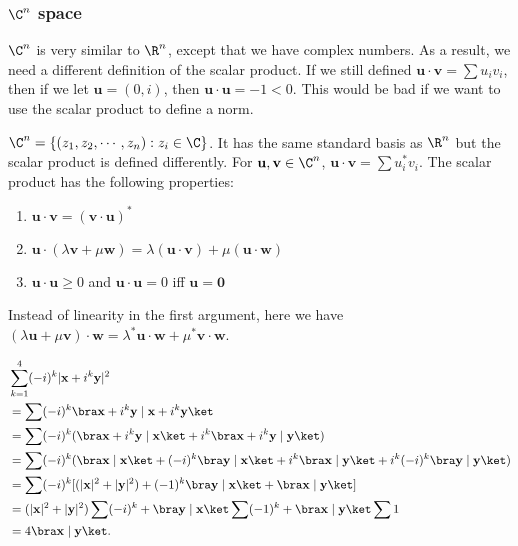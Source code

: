 \documentclass[a4paper]{article}
\begin{document}
\subsubsection{\texorpdfstring{$\C^n$}{Cn} space}
$\C^n$ is very similar to $\R^n$, except that we have complex numbers. As a result, we need a different definition of the scalar product. If we still defined $\mathbf{u}\cdot \mathbf{v} = \sum u_i v_i$, then if we let $\mathbf{u} = (0, i)$, then $\mathbf{u}\cdot \mathbf{u} = -1 < 0$. This would be bad if we want to use the scalar product to define a norm.

\begin{defi}[$\C^n$]
  $\C^n = \{(z_1, z_2, \cdots, z_n): z_i\in\C\}$. It has the same standard basis as $\R^n$ but the scalar product is defined differently. For $\mathbf{u, v}\in \C^n$, $\mathbf{u\cdot v} = \sum u_i^*v_i$. The scalar product has the following properties:
  \begin{enumerate}
    \item $\mathbf{u}\cdot \mathbf{v} = (\mathbf{v}\cdot \mathbf{u})^*$
    \item $\mathbf{u}\cdot(\lambda\mathbf{v}+\mu\mathbf{w}) = \lambda\mathbf{(u\cdot v)} + \mu\mathbf{(u\cdot w)}$
    \item $\mathbf{u\cdot u} \geq 0$ and $\mathbf{u\cdot u} = 0$ iff $\mathbf{u = 0}$
  \end{enumerate}
\end{defi}
Instead of linearity in the first argument, here we have $(\lambda\mathbf{u} + \mu\mathbf{v})\cdot\mathbf{w} = \lambda^*\mathbf{u}\cdot \mathbf{w} + \mu^*\mathbf{v}\cdot \mathbf{w}$.

\begin{eg}
  \begin{align*}
    &\sum_{k = 1}^4 (-i)^k|\mathbf{x} + i^k\mathbf{y}|^2\\
    &= \sum(-i)^k\bra\mathbf{x} + i^k \mathbf{y}\mid \mathbf{x} + i^k\mathbf{y}\ket\\
    &= \sum(-i)^k (\bra\mathbf{x} + i^k\mathbf{y}\mid \mathbf{x}\ket + i^k\bra\mathbf{x} + i^k\mathbf{y} \mid \mathbf{y}\ket)\\
    &= \sum(-i)^k (\bra\mathbf{x}\mid \mathbf{x}\ket + (-i)^k\bra\mathbf{y}\mid \mathbf{x}\ket + i^k\bra\mathbf{x}\mid \mathbf{y}\ket + i^k(-i)^k\bra\mathbf{y}\mid \mathbf{y}\ket)\\
    &= \sum(-i)^k [(| \mathbf{x}|^2 + |\mathbf{y}|^2) + (-1)^k\bra\mathbf{y}\mid \mathbf{x}\ket + \bra\mathbf{x}\mid \mathbf{y}\ket]\\
    &= (|\mathbf{x}|^2 + |\mathbf{y}|^2)\sum(-i)^k + \bra\mathbf{y}\mid \mathbf{x}\ket\sum(-1)^k + \bra\mathbf{x}\mid \mathbf{y}\ket\sum1\\
    &= 4\bra\mathbf{x}\mid \mathbf{y}\ket.
  \end{align*}
\end{eg}
\end{document}
